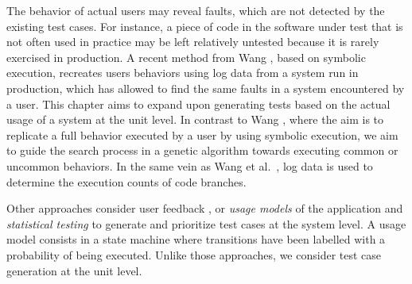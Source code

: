 The behavior of actual users may reveal faults, which are not detected by the existing test cases. For instance, a piece of code in the software under test that is not often used in practice may be left relatively untested because it is rarely exercised in production. 
A recent method from Wang \etal \cite{Wang2019}, based on symbolic execution, recreates users behaviors using log data from a system run in production, which has allowed to find the same faults in a system encountered by a user. 
%
This chapter aims to expand upon generating tests based on the actual usage of a system at the unit level.
In contrast to Wang \etal \cite{Wang2019}, where the aim is to replicate a full behavior executed by a user by using symbolic execution, we aim to guide the search process in a genetic algorithm towards executing common or uncommon behaviors. In the same vein as Wang et al.~\cite{Wang2019}, log data is used to determine the execution counts of code branches.

Other approaches consider user feedback \cite{Grano2018}, or \emph{usage models} of the application and \emph{statistical testing} \cite{Tonella2004c, Sprenkle2013, Kallepalli2001, Devroey2017b} to generate and prioritize test cases at the system level. A usage model consists in a state machine where transitions have been labelled with a probability of being executed. Unlike those approaches, we consider test case generation at the unit level. 